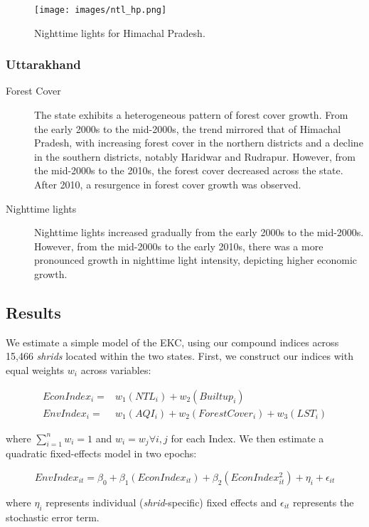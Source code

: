 \documentclass{article}
\begin{document}
\begin{figure}[h]
    \centering
    \texttt{[image: images/ntl\_hp.png]}
    \caption{Nighttime lights for Himachal Pradesh.}
\end{figure}


\subsubsection*{Uttarakhand}

\begin{description}
    \item[Forest Cover] The state exhibits a heterogeneous pattern of forest cover growth. From the early 2000s to the mid-2000s, the trend mirrored that of Himachal Pradesh, with increasing forest cover in the northern districts and a decline in the southern districts, notably Haridwar and Rudrapur. However, from the mid-2000s to the 2010s, the forest cover decreased across the state. After 2010, a resurgence in forest cover growth was observed.
    \item[Nighttime lights] Nighttime lights increased gradually from the early 2000s to the mid-2000s. However, from the mid-2000s to the early 2010s, there was a more pronounced growth in nighttime light intensity, depicting higher economic growth.

\end{description}

\subsection{Results}

We estimate a simple model of the EKC, using our compound indices across 15,466 \textit{shrids} located within the two states. First, we construct our indices with equal weights $w_i$ across variables:

\begin{align*}
    EconIndex_i = & w_1(NTL_i) + w_2(Builtup_i) \\
    EnvIndex_i = & w_1(AQI_i) + w_2(ForestCover_i) + w_3(LST_i)
\end{align*}

where $\sum_{i=1}^{n}w_i = 1$ and $w_i = w_j \forall i, j$ for each Index. We then estimate a quadratic fixed-effects model in two epochs:

\[
EnvIndex_{it} = \beta_0 + \beta_1(EconIndex_{it}) + \beta_2(EconIndex_{it}^2) + \eta_i + \epsilon_{it} 
\]

where $\eta_i$ represents individual (\textit{shrid}-specific) fixed effects and $\epsilon_{it}$ represents the stochastic error term.
\end{document}
